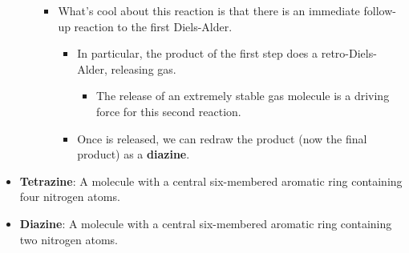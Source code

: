 \documentclass[../notes.tex]{subfiles}
\begin{document}
\begin{itemize}
\begin{enumerate}
\begin{itemize}
\begin{itemize}
            \end{itemize}
            \item What's cool about this reaction is that there is an immediate follow-up reaction to the first Diels-Alder.
            \begin{itemize}
                \item In particular, the product of the first step does a retro-Diels-Alder, releasing  gas.
                \begin{itemize}
                    \item The release of an extremely stable gas molecule is a driving force for this second reaction.
                \end{itemize}
                \item Once  is released, we can redraw the product (now the final product) as a \textbf{diazine}.
            \end{itemize}
        \end{itemize}
    \end{enumerate}
    \item \textbf{Tetrazine}: A molecule with a central six-membered aromatic ring containing four nitrogen atoms.
    \item \textbf{Diazine}: A molecule with a central six-membered aromatic ring containing two nitrogen atoms.
\end{itemize}
\end{document}

